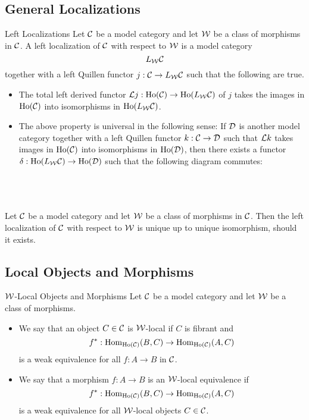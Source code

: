 \documentclass[a4paper]{article}
\begin{document}
\subsection{General Localizations}
\begin{defn}{Left Localizations}{} Let $\mathcal{C}$ be a model category and let $\mathcal{W}$ be a class of morphisms in $\mathcal{C}$. A left localization of $\mathcal{C}$ with respect to $\mathcal{W}$ is a model category $$L_{\mathcal{W}}\mathcal{C}$$ together with a left Quillen functor $j:\mathcal{C}\to L_{\mathcal{W}}\mathcal{C}$ such that the following are true. 
\begin{itemize}
\item The total left derived functor $\mathcal{L} j:\text{Ho}(\mathcal{C})\to\text{Ho}(L_{\mathcal{W}}\mathcal{C})$ of $j$ takes the images in $\text{Ho}(\mathcal{C})$ into isomorphisms in $\text{Ho}(L_{\mathcal{W}}\mathcal{C})$. 
\item The above property is universal in the following sense: If $\mathcal{D}$ is another model category together with a left Quillen functor $k:\mathcal{C}\to\mathcal{D}$ such that $\mathcal{L} k$ takes images in $\text{Ho}(\mathcal{C})$ into isomorphisms in $\text{Ho}(\mathcal{D})$, then there exists a functor $\delta:\text{Ho}(L_{\mathcal{W}}\mathcal{C})\to\text{Ho}(\mathcal{D})$ such that the following diagram commutes: \\~\\
\\~\\
\end{itemize}
\end{defn}

\begin{prp}{}{} Let $\mathcal{C}$ be a model category and let $\mathcal{W}$ be a class of morphisms in $\mathcal{C}$. Then the left localization of $\mathcal{C}$ with respect to $\mathcal{W}$ is unique up to unique isomorphism, should it exists. 
\end{prp}

\subsection{Local Objects and Morphisms}
\begin{defn}{$\mathcal{W}$-Local Objects and Morphisms}{} Let $\mathcal{C}$ be a model category and let $\mathcal{W}$ be a class of morphisms. 
\begin{itemize}
\item We say that an object $C\in\mathcal{C}$ is $\mathcal{W}$-local if $C$ is fibrant and $$f^\ast:\operatorname{Hom}_{\text{Ho}(\mathcal{C})}(B,C)\to\operatorname{Hom}_{\text{Ho}(\mathcal{C})}(A,C)$$ is a weak equivalence for all $f:A\to B$ in $\mathcal{C}$. 
\item We say that a morphism $f:A\to B$ is an $\mathcal{W}$-local equivalence if $$f^\ast:\operatorname{Hom}_{\text{Ho}(\mathcal{C})}(B,C)\to\operatorname{Hom}_{\text{Ho}(\mathcal{C})}(A,C)$$ is a weak equivalence for all $\mathcal{W}$-local objects $C\in\mathcal{C}$. 
\end{itemize}
\end{defn}
\end{document}
